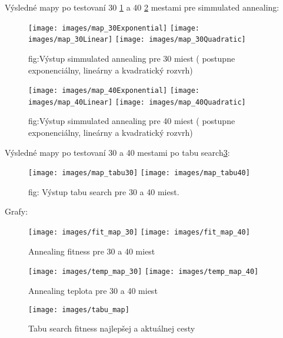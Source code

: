 Výsledné mapy po testovaní 30 \ref{fig:map_30}  a 40 \ref{fig:map_40} mestami pre simmulated annealing:

\begin{figure}
    \centering
    \texttt{[image: images/map\_30Exponential]}
    \texttt{[image: images/map\_30Linear]}
    \texttt{[image: images/map\_30Quadratic]}
    \caption{fig:Výstup simmulated annealing pre 30 miest ( postupne exponenciálny, lineárny a kvadratický rozvrh)}\label{fig:map_30}
\end{figure}

\begin{figure}
    \centering
    \texttt{[image: images/map\_40Exponential]}
    \texttt{[image: images/map\_40Linear]}
    \texttt{[image: images/map\_40Quadratic]}
    \caption{fig:Výstup simmulated annealing pre 40 miest ( postupne exponenciálny, lineárny a kvadratický rozvrh)}\label{fig:map_40}
\end{figure}

Výsledné mapy po testovaní 30 a 40 mestami po tabu search\ref{fig:tabu}:

\begin{figure}
    \centering
    \texttt{[image: images/map\_tabu30]}
    \texttt{[image: images/map\_tabu40]}
    \caption{fig: Výstup tabu search pre 30 a 40 miest.}\label{fig:tabu}
\end{figure}

Grafy:

\begin{figure}
    \centering
    \texttt{[image: images/fit\_map\_30]}
    \texttt{[image: images/fit\_map\_40]}
    \caption{Annealing fitness pre 30 a 40 miest}
    \label{fig:}
\end{figure}

\begin{figure}
    \centering
    \texttt{[image: images/temp\_map\_30]}
    \texttt{[image: images/temp\_map\_40]}
    \caption{Annealing teplota pre 30 a 40 miest}
    \label{fig:}
\end{figure}

\begin{figure}
    \centering
    \texttt{[image: images/tabu\_map]}
    \caption{Tabu search fitness najlepšej a aktuálnej cesty}
    \label{fig:}
\end{figure}





\endgroup